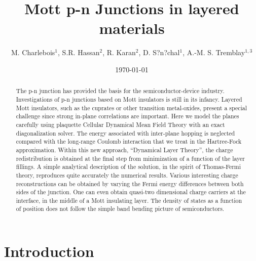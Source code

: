\documentclass[twocolumn, preprintnumbers,prb,aps,amssymb,showpacs]{revtex4}
\begin{document}
\title{Mott p-n Junctions in layered materials}
\author{M. Charlebois$^{1}$, S.R. Hassan$^{2}$, R. Karan$^{2}$, D. S?n?chal$^{1}$, A.-M. S. Tremblay$^{1,3}$}
\date{\today}

\begin{abstract}
The p-n junction has provided the basis for the semiconductor-device industry. Investigations of p-n junctions based on Mott insulators is still in its infancy. Layered Mott insulators, such as the cuprates or other transition metal-oxides, present a special challenge since strong in-plane correlations are important. Here we model the planes carefully using plaquette Cellular Dynamical Mean Field Theory with an exact diagonalization solver. The energy associated with inter-plane hopping is neglected compared with the long-range Coulomb interaction that we treat in the Hartree-Fock approximation. Within this new approach, ``Dynamical Layer Theory'', the charge redistribution is obtained at the final step from minimization of a function of the layer fillings. A simple analytical description of the solution, in the spirit of Thomas-Fermi theory, reproduces quite accurately the numerical results. Various interesting charge reconstructions can be obtained by varying the Fermi energy differences between both sides of the junction. One can even obtain quasi-two dimensional charge carriers at the interface, in the middle of a Mott insulating layer. The density of states as a function of position does not follow the simple band bending picture of semiconductors. 
\end{abstract}

\maketitle



\section{Introduction}
\end{document}
